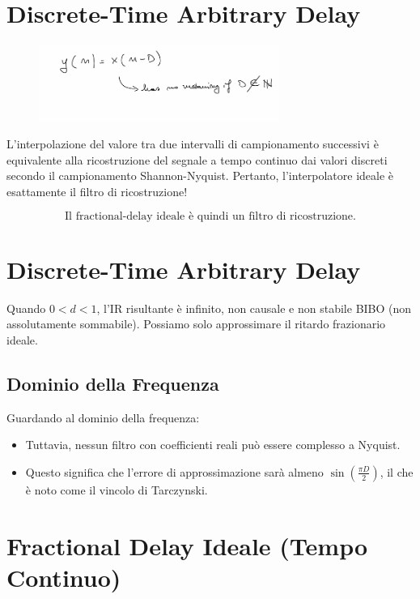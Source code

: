 \section{Discrete-Time Arbitrary Delay}

\begin{figure}[H]
    \centering
    \includegraphics[width=0.7\textwidth]{capitoli/capitolo14/immagini/image5.jpeg}
\end{figure}

L'interpolazione del valore tra due intervalli di campionamento successivi è equivalente alla ricostruzione del segnale a tempo continuo dai valori discreti secondo il campionamento Shannon-Nyquist. Pertanto, l'interpolatore ideale è esattamente il filtro di ricostruzione!

\[
\text{Il fractional-delay ideale è quindi un filtro di ricostruzione.}
\]

\section{Discrete-Time Arbitrary Delay}

Quando \( 0 < d < 1 \), l'IR risultante è infinito, non causale e non stabile BIBO (non assolutamente sommabile). Possiamo solo approssimare il ritardo frazionario ideale.

\subsection{Dominio della Frequenza}
Guardando al dominio della frequenza:

\begin{itemize}
    \item Tuttavia, nessun filtro con coefficienti reali può essere complesso a Nyquist.
    \item Questo significa che l'errore di approssimazione sarà almeno \( \sin\left( \frac{\pi D}{2} \right) \), il che è noto come il vincolo di Tarczynski.
\end{itemize}

\section{Fractional Delay Ideale (Tempo Continuo)}

